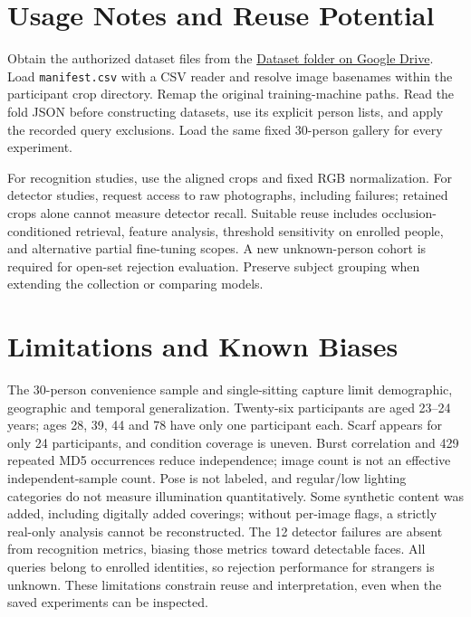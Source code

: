 \documentclass[11pt,a4paper]{article}
\newcommand{\code}[1]{\texttt{#1}}
\newcommand{\datasetlink}{\href{https://drive.google.com/drive/u/1/folders/1XN55OGpozy5Rhbs5QRFMatlCMTAo8sPu}{Dataset folder on Google Drive}}
\newcommand{\nextpage}{\clearpage}
\begin{document}
\nextpage
\section{Usage Notes and Reuse Potential}
Obtain the authorized dataset files from the \datasetlink. Load \code{manifest.csv} with a CSV reader and resolve image basenames within the participant crop directory. Remap the original training-machine paths. Read the fold JSON before constructing datasets, use its explicit person lists, and apply the recorded query exclusions. Load the same fixed 30-person gallery for every experiment.

For recognition studies, use the aligned crops and fixed RGB normalization. For detector studies, request access to raw photographs, including failures; retained crops alone cannot measure detector recall. Suitable reuse includes occlusion-conditioned retrieval, feature analysis, threshold sensitivity on enrolled people, and alternative partial fine-tuning scopes. A new unknown-person cohort is required for open-set rejection evaluation. Preserve subject grouping when extending the collection or comparing models.
\section{Limitations and Known Biases}
The 30-person convenience sample and single-sitting capture limit demographic, geographic and temporal generalization. Twenty-six participants are aged 23--24 years; ages 28, 39, 44 and 78 have only one participant each. Scarf appears for only 24 participants, and condition coverage is uneven. Burst correlation and 429 repeated MD5 occurrences reduce independence; image count is not an effective independent-sample count. Pose is not labeled, and regular/low lighting categories do not measure illumination quantitatively. Some synthetic content was added, including digitally added coverings; without per-image flags, a strictly real-only analysis cannot be reconstructed. The 12 detector failures are absent from recognition metrics, biasing those metrics toward detectable faces. All queries belong to enrolled identities, so rejection performance for strangers is unknown. These limitations constrain reuse and interpretation, even when the saved experiments can be inspected.
\end{document}
